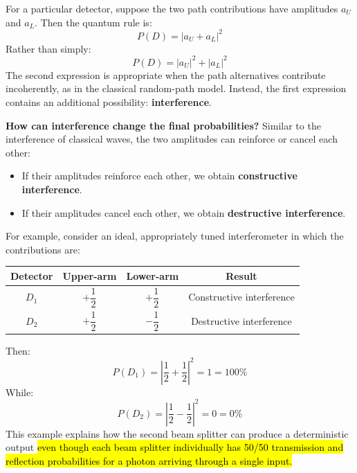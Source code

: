 \highspace
For a particular detector, suppose the two path contributions have amplitudes $a_U$ and $a_L$. Then the quantum rule is:
\begin{equation*}
    P(D) = \left|a_U + a_L\right|^2
\end{equation*}
Rather than simply:
\begin{equation*}
    P(D) = \left|a_U\right|^2 + \left|a_L\right|^2
\end{equation*}
The second expression is appropriate when the path alternatives contribute incoherently, as in the classical random-path model. Instead, the first expression contains an additional possibility: \textbf{interference}.

\highspace
\textcolor{Green3}{ \textbf{How can interference change the final probabilities?}} Similar to the interference of classical waves, the two amplitudes can reinforce or cancel each other:
\begin{itemize}
    \item If their amplitudes reinforce each other, we obtain \textbf{constructive interference}.
    \item If their amplitudes cancel each other, we obtain \textbf{destructive interference}.
\end{itemize}
For example, consider an ideal, appropriately tuned interferometer in which the contributions are:
\begin{center}
    \begin{tabular}{@{} c c c c @{}}
        \toprule
        \textbf{Detector} & \textbf{Upper-arm} & \textbf{Lower-arm} & \textbf{Result} \\
        \midrule
        $D_1$ & $+\dfrac{1}{2}$ & $+\dfrac{1}{2}$ & Constructive interference \\[1em]
        $D_2$ & $+\dfrac{1}{2}$ & $-\dfrac{1}{2}$ & Destructive interference \\
        \bottomrule
    \end{tabular}
    \label{tab:interference-at-bs2}
\end{center}
\noindent
Then:
\begin{equation*}
    P(D_1) = \left| \frac{1}{2} + \frac{1}{2} \right|^2 = 1 = 100\%
\end{equation*}
While:
\begin{equation*}
    P(D_2) = \left| \frac{1}{2} - \frac{1}{2} \right|^2 = 0 = 0\%
\end{equation*}
This example explains how the second beam splitter can produce a deterministic output \hl{even though each beam splitter individually has 50/50 transmission and reflection probabilities for a photon arriving through a single input.}

